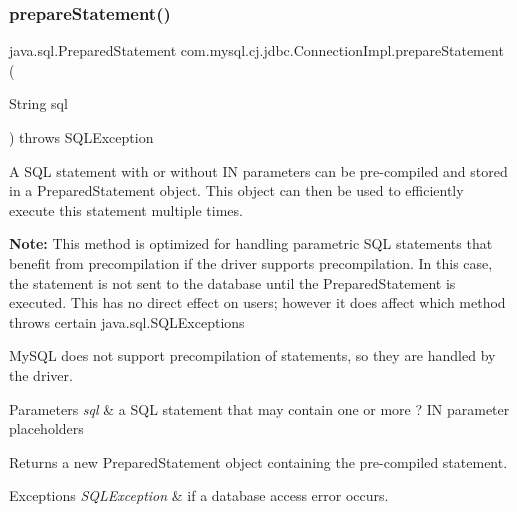\subsubsection{\texorpdfstring{prepare\+Statement()}{prepareStatement()}\hspace{0.1cm}{\footnotesize\ttfamily [1/2]}}
{\footnotesize\ttfamily java.\+sql.\+Prepared\+Statement com.\+mysql.\+cj.\+jdbc.\+Connection\+Impl.\+prepare\+Statement (\begin{DoxyParamCaption}\item[{String}]{sql }\end{DoxyParamCaption}) throws S\+Q\+L\+Exception}

A S\+QL statement with or without IN parameters can be pre-\/compiled and stored in a Prepared\+Statement object. This object can then be used to efficiently execute this statement multiple times. 

{\bfseries Note\+:} This method is optimized for handling parametric S\+QL statements that benefit from precompilation if the driver supports precompilation. In this case, the statement is not sent to the database until the Prepared\+Statement is executed. This has no direct effect on users; however it does affect which method throws certain java.\+sql.\+S\+Q\+L\+Exceptions 

My\+S\+QL does not support precompilation of statements, so they are handled by the driver. 


\begin{DoxyParams}{Parameters}
{\em sql} & a S\+QL statement that may contain one or more \textquotesingle{}?\textquotesingle{} IN parameter placeholders \\
\hline
\end{DoxyParams}
\begin{DoxyReturn}{Returns}
a new Prepared\+Statement object containing the pre-\/compiled statement. 
\end{DoxyReturn}

\begin{DoxyExceptions}{Exceptions}
{\em S\+Q\+L\+Exception} & if a database access error occurs. \\
\hline
\end{DoxyExceptions}
\mbox{\label{classcom_1_1mysql_1_1cj_1_1jdbc_1_1_connection_impl_a9673b3a241062ca773bdc76af945f62e}} 
